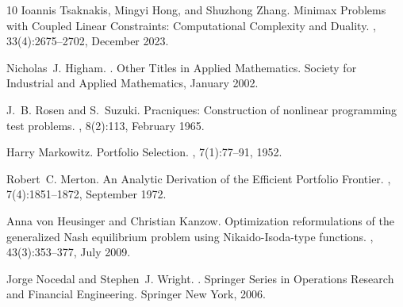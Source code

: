 \documentclass{article}
\begin{document}
\begin{thebibliography}{10}
		Ioannis Tsaknakis, Mingyi Hong, and Shuzhong Zhang.
		\newblock Minimax {{Problems}} with {{Coupled Linear Constraints}}:
		{{Computational Complexity}} and {{Duality}}.
		, 33(4):2675--2702, December 2023.
		
		Nicholas~J. Higham.
		.
		\newblock Other {{Titles}} in {{Applied Mathematics}}. {Society for Industrial
			and Applied Mathematics}, January 2002.
		
		J.~B. Rosen and S.~Suzuki.
		\newblock Pracniques: Construction of nonlinear programming test problems.
		, 8(2):113, February 1965.
		
		Harry Markowitz.
		\newblock Portfolio {{Selection}}.
		, 7(1):77--91, 1952.
		
		Robert~C. Merton.
		\newblock An {{Analytic Derivation}} of the {{Efficient Portfolio Frontier}}.
		,
		7(4):1851--1872, September 1972.
		
		Anna {von Heusinger} and Christian Kanzow.
		\newblock Optimization reformulations of the generalized {{Nash}} equilibrium
		problem using {{Nikaido-Isoda-type}} functions.
		, 43(3):353--377,
		July 2009.
		
		Jorge Nocedal and Stephen~J. Wright.
		.
		\newblock Springer {{Series}} in {{Operations Research}} and {{Financial
				Engineering}}. Springer New York, 2006.
		
	\end{thebibliography}
\end{document}
